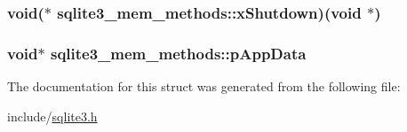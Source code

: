 \hypertarget{structsqlite3__mem__methods_6f48100692bd935d7f3dbb8c701ab6ca}{
\subsubsection[xShutdown]{\setlength{\rightskip}{0pt plus 5cm}void($\ast$ {\bf sqlite3\_\-mem\_\-methods::xShutdown})(void $\ast$)}}
\label{structsqlite3__mem__methods_6f48100692bd935d7f3dbb8c701ab6ca}


\hypertarget{structsqlite3__mem__methods_390f66d08d5a480544e919f64d7713de}{
\subsubsection[pAppData]{\setlength{\rightskip}{0pt plus 5cm}void$\ast$ {\bf sqlite3\_\-mem\_\-methods::pAppData}}}
\label{structsqlite3__mem__methods_390f66d08d5a480544e919f64d7713de}




The documentation for this struct was generated from the following file:\begin{CompactItemize}
\item 
include/\hyperlink{sqlite3_8h}{sqlite3.h}\end{CompactItemize}
